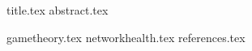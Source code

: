 \documentclass[11pt]{llncs}
\begin{document}
  {title.tex}
  \thispagestyle{plain}
  {abstract.tex}

  {gametheory.tex}
  {networkhealth.tex}
  {references.tex}
\end{document}

